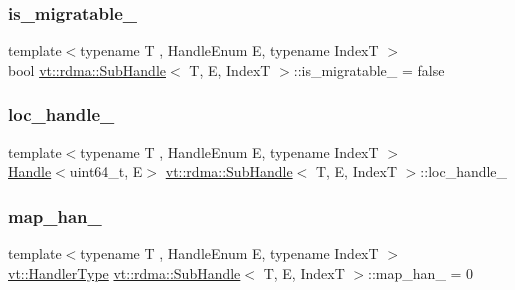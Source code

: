 \mbox{\label{structvt_1_1rdma_1_1_sub_handle_a2e2fe2ff0da95f9b228d4f0d3cf5b3ce}} 
\subsubsection{\texorpdfstring{is\+\_\+migratable\+\_\+}{is\_migratable\_}}
{\footnotesize\ttfamily template$<$typename T , Handle\+Enum E, typename IndexT $>$ \\
bool \hyperlink{structvt_1_1rdma_1_1_sub_handle}{vt\+::rdma\+::\+Sub\+Handle}$<$ T, E, IndexT $>$\+::is\+\_\+migratable\+\_\+ = false\hspace{0.3cm}{\ttfamily [protected]}}

\mbox{\label{structvt_1_1rdma_1_1_sub_handle_a2283d4e38954f446ae4a76ccfae5f19b}} 
\subsubsection{\texorpdfstring{loc\+\_\+handle\+\_\+}{loc\_handle\_}}
{\footnotesize\ttfamily template$<$typename T , Handle\+Enum E, typename IndexT $>$ \\
\hyperlink{structvt_1_1rdma_1_1_handle}{Handle}$<$uint64\+\_\+t, E$>$ \hyperlink{structvt_1_1rdma_1_1_sub_handle}{vt\+::rdma\+::\+Sub\+Handle}$<$ T, E, IndexT $>$\+::loc\+\_\+handle\+\_\+\hspace{0.3cm}{\ttfamily [protected]}}

\mbox{\label{structvt_1_1rdma_1_1_sub_handle_a5ecf30f3c569bbfe574df42843cf0059}} 
\subsubsection{\texorpdfstring{map\+\_\+han\+\_\+}{map\_han\_}}
{\footnotesize\ttfamily template$<$typename T , Handle\+Enum E, typename IndexT $>$ \\
\hyperlink{namespacevt_af64846b57dfcaf104da3ef6967917573}{vt\+::\+Handler\+Type} \hyperlink{structvt_1_1rdma_1_1_sub_handle}{vt\+::rdma\+::\+Sub\+Handle}$<$ T, E, IndexT $>$\+::map\+\_\+han\+\_\+ = 0\hspace{0.3cm}{\ttfamily [protected]}}

